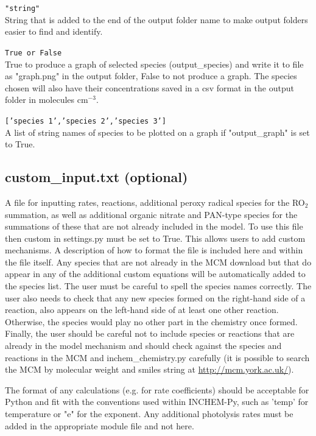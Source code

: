 \documentclass[a4paper]{refart}
\begin{document}
\texttt{"string"}\\
String that is added to the end of the output folder name to make output folders easier to find and identify. 

\texttt{True or False}\\
True to produce a graph of selected species (output\_species) and write it to file as "graph.png" in the output folder, False to not produce a graph. The species chosen will also have their concentrations saved in a csv format in the output folder in molecules cm$^{-3}$.

\texttt{['species 1','species 2','species 3']}\\
A list of string names of species to be plotted on a graph if "output\_graph" is set to True.

\subsection{custom\_input.txt (optional)}\label{custom_input.txt}
A file for inputting rates, reactions, additional peroxy radical species for the RO$_2$ summation, as well as additional organic nitrate and PAN-type species for the summations of these that are not already included in the model. To use this file then custom in settings.py must be set to True. This allows users to add custom mechanisms. A description of how to format the file is included here and within the file itself. Any species that are not already in the MCM download but that do appear in any of the additional custom equations will be automatically added to the species list. The user must be careful to spell the species names correctly. The user also needs to check that any new species formed on the right-hand side of a reaction, also appears on the left-hand side of at least one other reaction. Otherwise, the species would play no other part in the chemistry once formed. Finally, the user should be careful not to include species or reactions that are already in the model mechanism and should check against the species and reactions in the MCM and inchem\_chemistry.py carefully (it is possible to search the MCM by molecular weight and smiles string at \url{http://mcm.york.ac.uk/}).

The format of any calculations (e.g. for rate coefficients) should be acceptable for Python and fit with the conventions used within INCHEM-Py, such as 'temp' for temperature or "e" for the exponent. Any additional photolysis rates must be added in the appropriate module file and not here.
\end{document}
